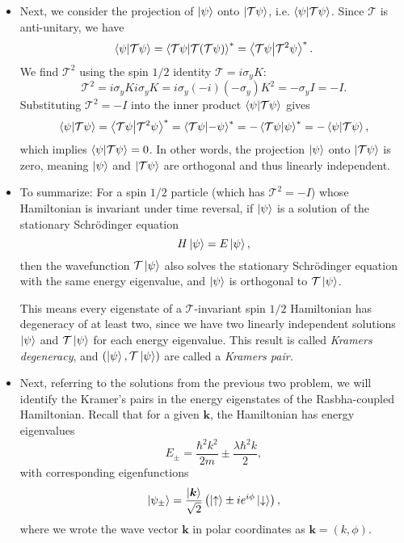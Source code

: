 \documentclass[11pt, a4paper]{article}
\newcommand{\Schro}{Schr\"{o}dinger\xspace}
\newcommand{\Ham}{Hamiltonian\xspace}
\renewcommand{\vec}[1]{\bm{#1}} %
\newcommand{\ua}{\uparrow}  %
\newcommand{\da}{\downarrow}  %
\renewcommand{\k}{\vec{k}}  %
\newcommand{\T}{\mathcal{T}}  %
\begin{document}
\begin{itemize}
	\item Next, we consider the projection of $ \ket{\psi} $ onto $ \ket{\T \psi} $, i.e. $ \braket{\psi}{\T\psi} $. Since $ \T $ is anti-unitary, we have
	\begin{equation*}
		\braket{\psi}{\T\psi} = \braket{\T\psi}{\T(\T\psi)}^{*} = \braket{\T\psi}{\T^{2}\psi}^{*}.
	\end{equation*}
	We find $ \T^{2} $ using the spin $ 1/2 $ identity $ \T = i \sigma_{y}K $:
	\begin{equation*}
		\T^{2} = i \sigma_{y}K i\sigma_{y}K = i\sigma_{y}(-i)(-\sigma_{y})K^{2} = -\sigma_{y} I = - I.
	\end{equation*}
	Substituting $ \T^{2} = - I $ into the inner product $ \braket{\psi}{\T\psi} $ gives
	\begin{equation*}
		\braket{\psi}{\T\psi} = \braket{\T\psi}{\T^{2}\psi}^{*} = \braket{\T\psi}{-\psi}^{*} = -\braket{\T\psi}{\psi}^{*} = - \braket{\psi}{\T\psi},
	\end{equation*}
	which implies $ \braket{\psi}{\T\psi} = 0 $. In other words, the projection  $ \ket{\psi} $ onto $ \ket{\T \psi} $ is zero, meaning $ \ket{\psi} $ and $ \ket{\T \psi} $ are orthogonal and thus linearly independent.
	
	
	\item To summarize: For a spin $ 1/2 $ particle (which has $ \T^{2} = -I $) whose Hamiltonian is invariant under time reversal, if $ \ket{\psi} $ is a solution of the stationary \Schro equation
	\begin{equation*}
		H \ket{\psi} = E\ket{\psi},
	\end{equation*}
	then the wavefunction $ \T\ket{\psi} $ also solves the stationary \Schro equation with the same energy eigenvalue, and $ \ket{\psi} $ is orthogonal to $ \T \ket{\psi} $. 
	
	This means every eigenstate of a $ \T $-invariant spin $ 1/2 $ Hamiltonian has degeneracy of at least two, since we have two linearly independent solutions $ \ket{\psi} $ and $ \T \ket{\psi} $ for each energy eigenvalue. This result is called \textit{Kramers degeneracy}, and $ (\ket{\psi}, \T\ket{\psi}) $ are called a \textit{Kramers pair. }

	\item Next, referring to the solutions from the previous two problem, we will identify the Kramer's pairs in the energy eigenstates of the Rasbha-coupled Hamiltonian. Recall that for a given $ \k $, the \Ham has energy eigenvalues
	\begin{equation*}
		E_{\pm} = \frac{\hbar^{2}k^{2}}{2m} \pm \frac{\lambda\hbar^{2}k}{2},
	\end{equation*}
	with corresponding eigenfunctions
	\begin{equation*}
		\ket{\psi_{\pm}} = \frac{\ket{\k}}{\sqrt{2}}\left(\ket{\ua} \pm ie^{i\phi}\ket{\da}\right),
	\end{equation*}
	where we wrote the wave vector $ \k $ in polar coordinates as $ \k = (k, \phi) $. 
	

\end{itemize}
\end{document}
